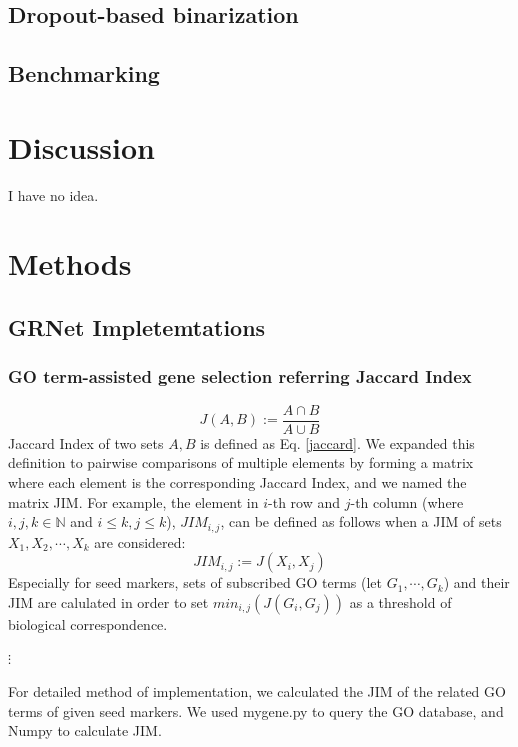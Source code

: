 \documentclass{article}
\begin{document}
\subsection*{Dropout-based binarization}
\subsection*{Benchmarking}

\section*{Discussion}
I have no idea.

\section*{Methods}
\subsection*{GRNet Impletemtations}

\subsubsection*{GO term-assisted gene selection referring Jaccard Index}
\begin{equation}\label{jaccard}
  J(A, B) := \frac{A\cap B}{A\cup B}
\end{equation}
Jaccard Index of two sets $A, B$ is defined as Eq. \eqref{jaccard}. We expanded this 
definition to pairwise comparisons of multiple elements by forming a matrix 
where each element is the corresponding Jaccard Index, and we named the matrix \ac{JIM}. For example, the element in 
$i$-th row and $j$-th column (where $i, j, k\in\mathbb{N}$ and $i\leq k, j\leq k$), $JIM_{i,j}$, can be defined as
follows when a JIM of sets $X_1, X_2,\cdots, X_k$ are considered:
\begin{equation}\label{jim}
  JIM_{i, j} := J(X_i, X_j)
\end{equation}
Especially for seed markers, sets of subscribed GO terms (let $G_1, \cdots, G_k$)
and their JIM are calulated in order to set $min_{i,j}(J(G_i, G_j))$ as a threshold of 
biological correspondence.

$\vdots$

For detailed method of implementation, we calculated the JIM of the related GO terms of given seed markers. We used mygene.py\cite{mygene} to query the GO database, and Numpy\cite{numpy} to calculate JIM.
\end{document}
